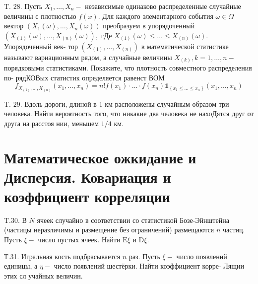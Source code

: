 \documentclass[a4paper,12pt]{article} %
\begin{document}
\begin{example}

T. $28 .$ Пусть $X_{1}, \ldots, X_{n}-$ независимые одинаково распределенные случайные величины с плотностью $f(x) .$ Для каждого элементарного события $\omega \in \Omega$ вектор $\left(X_{1}(\omega), \ldots, X_{n}(\omega)\right)$ преобразуем в упорядоченный $\left(X_{(1)}(\omega), \ldots, X_{(n)}(\omega)\right),$ гДе $X_{(1)}(\omega) \leq \ldots \leq X_{(n)}(\omega) .$ Упорядоченный век-
тор $\left(X_{(1)}, \ldots, X_{(n)}\right)$ в математической статистике называют вариационным рядом, а случайные величины $X_{(k)}, k=1, \ldots, n-$ порядковыми статистиками. Покажите, что плотность совместного распределения по-
рядКОВых статистик определяется равенст ВОМ
$$
f_{X_{(1)}, \ldots, X_{(n)}}\left(x_{1}, \ldots, x_{n}\right)=n ! f\left(x_{1}\right) \cdot \ldots \cdot f\left(x_{n}\right) \mathbb{1}_{\left\{x_{1} \leq \ldots \leq x_{n}\right\}}\left(x_{1}, \ldots, x_{n}\right)
$$




\end{example}



\begin{example}


T. $29 .$ Вдоль дороги, длиной в 1 км расположены случайным образом три человека. Найти вероятность того, что никакие два человека не нахоДятся друг от друга на расстоя нии, меньшем $1 / 4$ км.



\end{example}


\section{Математическое ожкидание и Дисперсия. Ковариация и коэффициент корреляции}


\begin{example}

T.30. В $N$ ячеек случайно в соответствии со статистикой Бозе-Эйнштейна (частицы неразличимы и размещение без ограничений) размещаются $n$ частиц. Пусть $\xi-$ число пустых ячеек. Найти $\mathrm{E} \xi$ и $\mathrm{D} \xi$.




\end{example}







\begin{example}


Т.31. Игральная кость подбрасывается $n$ раз. Пусть $\xi-$ число появлений единицы, а $\eta-$ число появлений шестёрки. Найти коэффициент корре-
Лящии этих сл учайных величин.



\end{example}
\end{document}
